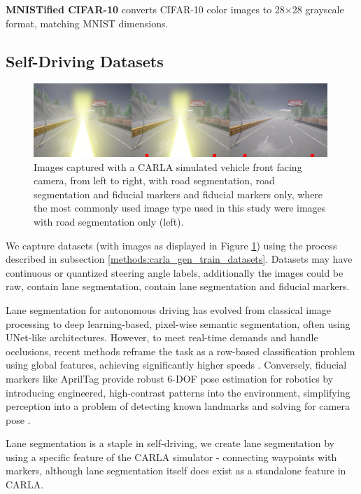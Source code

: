 \textbf{MNISTified CIFAR-10} converts CIFAR-10 color images to 28×28 grayscale format, matching MNIST dimensions.


\subsection{Self-Driving Datasets}

\begin{figure}[h]
\centering
\includegraphics[width=0.99\textwidth]{Figures/Methods/carla_dataset_seg_segfid_fid.jpg}
\caption{Images captured with a CARLA simulated vehicle front facing camera, from left to right, with road segmentation, road segmentation and fiducial markers and fiducial markers only, where the most commonly used image type used in this study were images with road segmentation only (left).}
\label{fig:carla_dataset_seg_segfid_fid}
\end{figure}

We capture datasets (with images as displayed in Figure \ref{fig:carla_dataset_seg_segfid_fid}) using the process described in subsection \ref{methods:carla_gen_train_datasets}. Datasets may have continuous or quantized steering angle labels, additionally the images could be raw, contain lane segmentation, contain lane segmentation and fiducial markers.
 
Lane segmentation for autonomous driving has evolved from classical image processing to deep learning-based, pixel-wise semantic segmentation, often using UNet-like architectures. However, to meet real-time demands and handle occlusions, recent methods reframe the task as a row-based classification problem using global features, achieving significantly higher speeds \cite{qin2020ultra}. Conversely, fiducial markers like AprilTag provide robust 6-DOF pose estimation for robotics by introducing engineered, high-contrast patterns into the environment, simplifying perception into a problem of detecting known landmarks and solving for camera pose \cite{olson2011tags}.

Lane segmentation is a staple in self-driving, we create lane segmentation by using a specific feature of the CARLA simulator - connecting waypoints with markers, although lane segmentation itself does exist as a standalone feature in CARLA.

